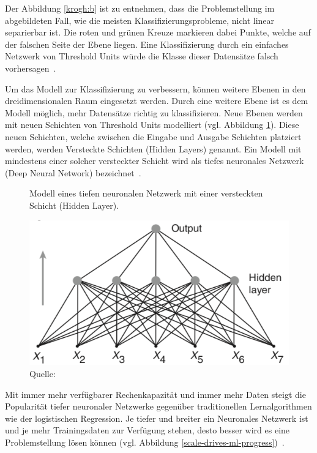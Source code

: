 Der Abbildung \ref{krogh:b} ist zu entnehmen, dass die Problemstellung im abgebildeten Fall, wie die meisten Klassifizierungsprobleme, nicht linear separierbar ist. Die roten und grünen Kreuze markieren dabei Punkte, welche auf der falschen Seite der Ebene liegen. Eine Klassifizierung durch ein einfaches Netzwerk von Threshold Units würde die Klasse dieser Datensätze falsch vorhersagen~\autocite{Krogh2008}.

Um das Modell zur Klassifizierung zu verbessern, können weitere Ebenen in den dreidimensionalen Raum eingesetzt werden. Durch eine weitere Ebene ist es dem Modell möglich, mehr Datensätze richtig zu klassifizieren. Neue Ebenen werden mit neuen Schichten von Threshold Units modelliert (vgl. Abbildung \ref{krogh:c}). Diese neuen Schichten, welche zwischen die Eingabe und Ausgabe Schichten platziert werden, werden Versteckte Schichten (Hidden Layers) genannt. Ein Modell mit mindestens einer solcher versteckter Schicht wird als tiefes neuronales Netzwerk (Deep Neural Network) bezeichnet~\autocite{Krogh2008}.

\begin{figure}[h]
    \captionsetup{width=.9\linewidth}
    \caption[Modell eines tiefen neuronalen Netzwerk]{Modell eines tiefen neuronalen Netzwerk mit einer versteckten Schicht (Hidden Layer).}
    \label{krogh:c}
    \centering
    \includegraphics[width=0.4\linewidth]{graphics/krogh/krogh_deep-network.png}
    \caption*{Quelle: \textcite{Krogh2008}}
\end{figure}

Mit immer mehr verfügbarer Rechenkapazität und immer mehr Daten steigt die Popularität tiefer neuronaler Netzwerke gegenüber traditionellen Lernalgorithmen wie der logistischen Regression. Je tiefer und breiter ein Neuronales Netzwerk ist und je mehr Trainingsdaten zur Verfügung stehen, desto besser wird es eine Problemstellung lösen können (vgl. Abbildung \ref{scale-drives-ml-progress})~\autocite{MLYearning}.

